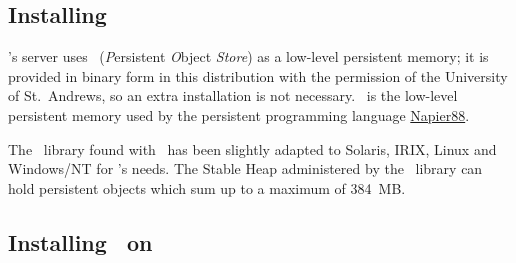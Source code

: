 \subsection[Installing POSTORE]%
{Installing \protect\postore}\label{sec:postore}

\plob's server uses \postore\ (\textit{P}ersistent \textit{O}bject
\textit{Store}) as a low-level persistent memory; it is provided in
binary form in this distribution with the permission of the University
of St.\ Andrews, so an extra installation is not necessary.  \postore\
is the low-level persistent memory used by the persistent programming
language \href{http://www-ppg.dcs.st-and.ac.uk}{Napier88}.

The \postore\ library found with \plob\ has been slightly adapted to
Solaris, IRIX, Linux and Windows/NT for \plob's needs. The Stable Heap
administered by the \postore\ library can hold persistent objects
which sum up to a maximum of 384~MB.

\subsection[Installing PLOB on Unix]%
{Installing \protect\plob\ on \protect\unix}%
\label{sec:install}

